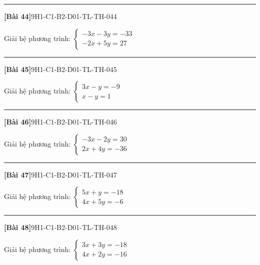 \documentclass[12pt,a4paper]{article}
\newif\ifloigiai
\newenvironment{cauhoi}[2]{%
  \par\medskip\noindent\rule{\textwidth}{0.4pt}\par\nopagebreak
  \noindent\textbf{[#1]}\hfill{\scriptsize\ttfamily #2}\par\nopagebreak\smallskip}{\par}
\newcommand{\loigiai}[1]{\ifloigiai\par\smallskip\noindent\textit{Lời giải.} #1\par\fi}
\begin{document}
\begin{cauhoi}{Bài 44}{9H1-C1-B2-D01-TL-TH-044}
Giải hệ phương trình: $\begin{cases}-3x - 3y=-33\\ -2x + 5y=27\end{cases}$
\loigiai{Nhân hai vế của phương trình thứ nhất với $5$ và phương trình thứ hai với $3$ rồi cộng từng vế để khử $y$: $-21x=-84$, suy ra $x=4$. Thay $x=4$ vào phương trình thứ nhất: $-3\cdot(4)-3y=-33$, suy ra $y=7$. Vậy hệ có nghiệm $(x;y)=(4;7)$.}
\end{cauhoi}
\begin{cauhoi}{Bài 45}{9H1-C1-B2-D01-TL-TH-045}
Giải hệ phương trình: $\begin{cases}3x - y=-9\\ x - y=1\end{cases}$
\loigiai{Nhân hai vế của phương trình thứ nhất với $-1$ và phương trình thứ hai với $1$ rồi cộng từng vế để khử $y$: $-2x=10$, suy ra $x=-5$. Thay $x=-5$ vào phương trình thứ nhất: $3\cdot(-5)-y=-9$, suy ra $y=-6$. Vậy hệ có nghiệm $(x;y)=(-5;-6)$.}
\end{cauhoi}
\begin{cauhoi}{Bài 46}{9H1-C1-B2-D01-TL-TH-046}
Giải hệ phương trình: $\begin{cases}-3x - 2y=30\\ 2x + 4y=-36\end{cases}$
\loigiai{Nhân hai vế của phương trình thứ nhất với $2$ và phương trình thứ hai với $1$ rồi cộng từng vế để khử $y$: $-4x=24$, suy ra $x=-6$. Thay $x=-6$ vào phương trình thứ nhất: $-3\cdot(-6)-2y=30$, suy ra $y=-6$. Vậy hệ có nghiệm $(x;y)=(-6;-6)$.}
\end{cauhoi}
\begin{cauhoi}{Bài 47}{9H1-C1-B2-D01-TL-TH-047}
Giải hệ phương trình: $\begin{cases}5x + y=-18\\ 4x + 5y=-6\end{cases}$
\loigiai{Nhân hai vế của phương trình thứ nhất với $5$ và phương trình thứ hai với $-1$ rồi cộng từng vế để khử $y$: $21x=-84$, suy ra $x=-4$. Thay $x=-4$ vào phương trình thứ nhất: $5\cdot(-4)+y=-18$, suy ra $y=2$. Vậy hệ có nghiệm $(x;y)=(-4;2)$.}
\end{cauhoi}
\begin{cauhoi}{Bài 48}{9H1-C1-B2-D01-TL-TH-048}
Giải hệ phương trình: $\begin{cases}3x + 3y=-18\\ 4x + 2y=-16\end{cases}$
\loigiai{Nhân hai vế của phương trình thứ nhất với $2$ và phương trình thứ hai với $-3$ rồi cộng từng vế để khử $y$: $-6x=12$, suy ra $x=-2$. Thay $x=-2$ vào phương trình thứ nhất: $3\cdot(-2)+3y=-18$, suy ra $y=-4$. Vậy hệ có nghiệm $(x;y)=(-2;-4)$.}
\end{cauhoi}
\end{document}
